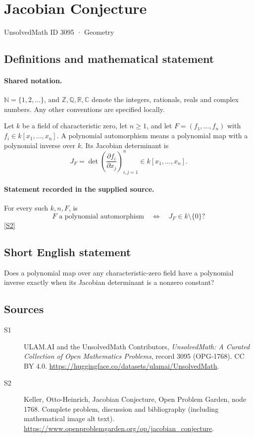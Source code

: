 \documentclass[11pt]{book}
\newcommand{\sref}[2]{\hyperlink{source:#1:#2}{[S#2]}}
\begin{document}
\setcounter{section}{3094}
\section{Jacobian Conjecture}\label{3095}
{\small\sffamily UnsolvedMath ID 3095 · Geometry}
\subsection{Definitions and mathematical statement}

\paragraph{Shared notation.}$\mathbb N=\{1,2,\ldots\}$, and $\mathbb Z,\mathbb Q,\mathbb R,\mathbb C$ denote the integers, rationals, reals and complex numbers. Any other conventions are specified locally.


Let $k$ be a field of characteristic zero, let $n\geq1$, and let $F=(f_1,\ldots,f_n)$ with $f_i\in k[x_1,\ldots,x_n]$. A polynomial automorphism means a polynomial map with a polynomial inverse over $k$. Its Jacobian determinant is
\[J_F=\det\left(\frac{\partial f_i}{\partial x_j}\right)_{i,j=1}^n\in k[x_1,\ldots,x_n].\]
\paragraph{Statement recorded in the supplied source.}
For every such $k,n,F$, is
\[F\text{ a polynomial automorphism}\quad\Longleftrightarrow\quad J_F\in k\setminus\{0\}?\] \sref{3095}{2}
\subsection{Short English statement}
Does a polynomial map over any characteristic-zero field have a polynomial inverse exactly when its Jacobian determinant is a nonzero constant?
\subsection{Sources}
\begin{description}
\item[\hypertarget{source:3095:1}{S1}] ULAM.AI and the UnsolvedMath Contributors, \emph{UnsolvedMath: A Curated Collection of Open Mathematics Problems}, record 3095 (OPG-1768). CC BY 4.0. \url{https://huggingface.co/datasets/ulamai/UnsolvedMath}.
\item[\hypertarget{source:3095:2}{S2}] Keller, Otto-Heinrich, Jacobian Conjecture, Open Problem Garden, node 1768. Complete problem, discussion and bibliography (including mathematical image alt text). \url{https://www.openproblemgarden.org/op/jacobian_conjecture}.
\end{description}
\label{end:3095}
\end{document}
